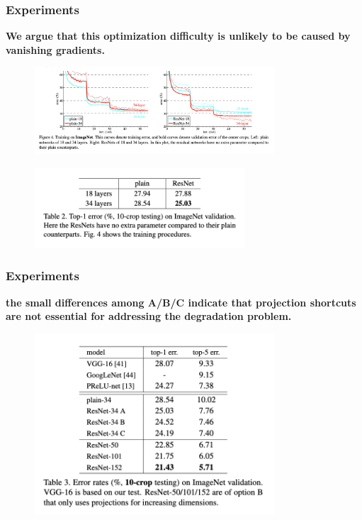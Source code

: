 \documentclass[
	11pt, %
]{beamer}
\begin{document}
\begin{frame}
	\frametitle{Experiments}

	\textbf{We argue that this optimization difficulty is unlikely to be caused by vanishing gradients.}

	\begin{figure}
		\centering
		\includegraphics[width=0.8\textwidth]{./images/Screenshot 2025-05-20 at 0.33.26.png}
	\end{figure}

	\begin{figure}
		\centering
		\includegraphics[width=0.7\textwidth]{./images/Screenshot 2025-05-20 at 0.33.49.png}
	\end{figure}
\end{frame}

\begin{frame}
	\frametitle{Experiments}

	\textbf{the small differences among A/B/C indicate that projection shortcuts are not essential for addressing the degradation problem.}

	\begin{figure}
		\centering
		\includegraphics[width=0.8\textwidth]{./images/Screenshot 2025-05-20 at 0.34.01.png}
	\end{figure}
\end{frame}
\end{document}

